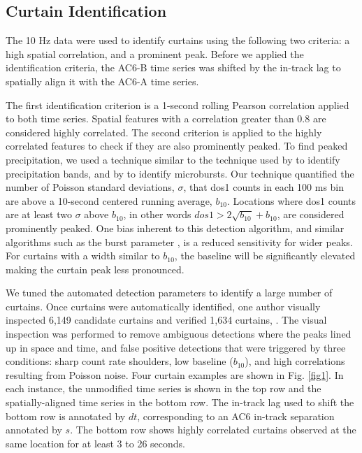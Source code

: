 \documentclass[draft]{agujournal2019}
\begin{document}
\subsection{Curtain Identification} \label{curtain_identification}
The 10 Hz data were used to identify curtains using the following two criteria: a high spatial correlation, and a prominent peak. Before we applied the identification criteria, the AC6-B time series was shifted by the in-track lag to spatially align it with the AC6-A time series. 

The first identification criterion is a 1-second rolling Pearson correlation applied to both time series. Spatial features with a correlation greater than 0.8 are considered highly correlated. The second criterion is applied to the highly correlated features to check if they are also prominently peaked. To find peaked precipitation, we used a technique similar to the technique used by  to identify precipitation bands, and by  to identify microbursts. Our technique quantified the number of Poisson standard deviations, $\sigma$, that dos1 counts in each 100 ms bin are above a 10-second centered running average, $b_{10}$. Locations where dos1 counts are at least two $\sigma$ above $b_{10}$, in other words $dos1 > 2\sqrt{b_{10}} + b_{10}$, are considered prominently peaked. One bias inherent to this detection algorithm, and similar algorithms such as the burst parameter \cite{O'Brien2003}, is a reduced sensitivity for wider peaks. For curtains with a width similar to $b_{10}$, the baseline will be significantly elevated making the curtain peak less pronounced.

We tuned the automated detection parameters to identify a large number of curtains. Once curtains were automatically identified, one author visually inspected 6,149 candidate curtains and verified 1,634 curtains, . The visual inspection was performed to remove ambiguous detections where the peaks lined up in  space and time, and false positive detections that were triggered by three conditions: sharp count rate shoulders, low baseline ($b_{10}$), and high correlations resulting from Poisson noise. Four curtain examples are shown in Fig. \ref{fig1}. In each instance, the unmodified time series is shown in the top row and the spatially-aligned time series in the bottom row. The in-track lag used to shift the bottom row is annotated by $dt$, corresponding to an AC6 in-track separation annotated by $s$. The bottom row shows highly correlated curtains observed at the same location for at least 3 to 26 seconds.
\end{document}
